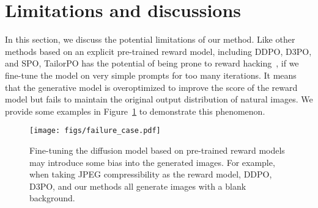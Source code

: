 \begin{table}[h]
    \centering
    \caption{Effect of each component in our framework.
    \vspace{-5pt}}
    \label{tab: effect of components}
    \vspace{-5pt}
\end{table}

\section{Limitations and discussions}
\label{sec: app_limitation}

In this section, we discuss the potential limitations of our method.
Like other methods based on an explicit pre-trained reward model, including DDPO, D3PO, and SPO, TailorPO has the potential of being prone to reward hacking~\citep{skalse22defining}, if we fine-tune the model on very simple prompts for too many iterations. It means that the generative model is overoptimized to improve the score of the reward model but fails to maintain the original output distribution of natural images. We provide some examples in Figure~\ref{fig: reward hacking} to demonstrate this phenomenon. 
\begin{figure}[h]
    \centering
    \begin{minipage}{0.38\linewidth}
        \caption{Fine-tuning the diffusion model based on pre-trained reward models may introduce some bias into the generated images. For example, when taking JPEG compressibility as the reward model, DDPO, D3PO, and our methods all generate images with a blank background.}
    \label{fig: reward hacking}
    \end{minipage}
    \hfill
    \begin{minipage}{0.6\linewidth}
        \centering
        \texttt{[image: figs/failure\_case.pdf]}
    \end{minipage}
    \vspace{-5pt}
\end{figure}


